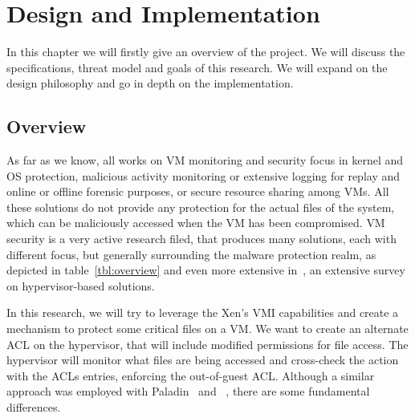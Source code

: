 
\chapter{Design and Implementation}\label{ch:chapter3}

In this chapter we will firstly give an overview of the project. We will discuss the specifications, threat model and goals of this research. We will expand on the design philosophy and go in depth on the implementation.

\section{Overview}

As far as we know, all works on \ac{VM} monitoring and security focus in kernel and \ac{OS} protection, malicious activity monitoring or extensive logging for replay and online or offline forensic purposes, or secure resource sharing among \ac{VM}s. All these solutions do not provide any protection for the actual files of the system, which can be maliciously accessed when the \ac{VM} has been compromised. \ac{VM} security is a very active research filed, that produces many solutions, each with different focus, but generally surrounding the malware protection realm, as depicted in table~\ref{tbl:overview} and even more extensive in~\cite{bauman2015survey}, an extensive survey on hypervisor-based solutions.

\par In this research, we will try to leverage the Xen’s \ac{VMI} capabilities and create a mechanism to protect some critical files on a \ac{VM}. We want to create an alternate \ac{ACL} on the hypervisor, that will include modified permissions for file access. The hypervisor will monitor what files are being accessed and cross-check the action with the \ac{ACL}s entries, enforcing the out-of-guest \ac{ACL}. Although a similar approach was employed with Paladin~\cite{baliga2008automated} and ~\cite{nasab2012security}, there are some fundamental differences. 


